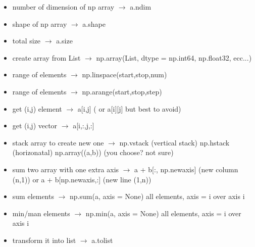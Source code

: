 \documentclass{article}
\begin{document}
\begin{itemize}
\item number of dimension of np array $\rightarrow$ a.ndim
\item shape of np array $\rightarrow$ a.shape
\item total size  $\rightarrow$ a.size
\item create array from List $\rightarrow$ np.array(List, dtype = np.int64, np.float32, ecc...)
\item range of elements $\rightarrow$ np.linspace(start,stop,num)
\item range of elements $\rightarrow$ np.arange(start,stop,step)
\item get (i,j) element $\rightarrow$ a[i,j] ( or  a[i][j]  but best to avoid)
\item get (i,j) vector $\rightarrow$ a[i,:,j,:] 
\item stack array to create new one $\rightarrow$ np.vstack (vertical stack) np.hstack (horizonatal) np.array((a,b)) (you choose? not sure)
\item sum two array with one extra axis   $\rightarrow$ a + b[:, np.newaxis] (new column (n,1)) or a + b[np.newaxis,:] (new line (1,n))
\item sum  elements  $\rightarrow$ np.sum(a, axis = None) all elements, axis = i over axis i
\item min/man  elements  $\rightarrow$ np.min(a, axis = None) all elements, axis = i over axis i
\item transform it into list $\rightarrow$ a.tolist
\end{itemize}
\end{document}
